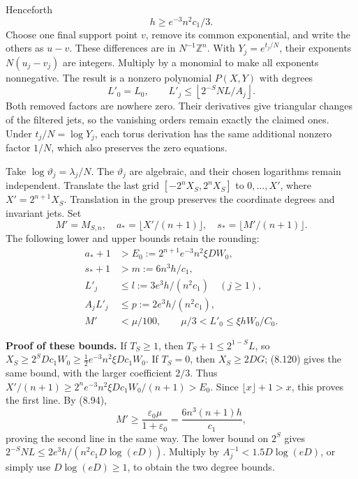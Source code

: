 \documentclass[
  11pt,
  a4paper,
]{article}
\begin{document}
Henceforth \[
h\ge e^{-3}n^2c_1/3.
\tag{8.120}
\] Choose one final support point \(v\), remove its common exponential,
and write the others as \(u-v\). These differences are in
\(N^{-1}\mathbb Z^n\). With \(Y_j=e^{t_j/N}\), their exponents
\(N(u_j-v_j)\) are integers. Multiply by a monomial to make all
exponents nonnegative. The result is a nonzero polynomial \(P(X,Y)\)
with degrees \[
L'_0=L_0,\qquad
L'_j\le\left\lfloor2^{-S}NL/A_j\right\rfloor.
\tag{8.121}
\] Both removed factors are nowhere zero. Their derivatives give
triangular changes of the filtered jets, so the vanishing orders remain
exactly the claimed ones. Under \(t_j/N=\log Y_j\), each torus
derivation has the same additional nonzero factor \(1/N\), which also
preserves the zero equations.

Take \(\log\vartheta_j=\lambda_j/N\). The \(\vartheta_j\) are algebraic,
and their chosen logarithms remain independent. Translate the last grid
\([-2^nX_S,2^nX_S]\) to \(0,\ldots,X'\), where \(X'=2^{n+1}X_S\).
Translation in the group preserves the coordinate degrees and invariant
jets. Set \[
M'=M_{S,n},\quad
a_*=\lfloor X'/(n+1)\rfloor,\quad
s_*=\lfloor M'/(n+1)\rfloor.
\] The following lower and upper bounds retain the rounding: \[
\begin{aligned}
a_*+1&>E_0:=2^{n+1}e^{-3}n^2\xi DW_0,\\
s_*+1&>m:=6n^3h/c_1,\\
L'_j&\le l:=3e^3h/(n^2c_1)\quad(j\ge1),\\
A_jL'_j&\le p:=2e^3h/(n^2c_1),\\
M'&<\mu/100,\qquad
\mu/3<L'_0\le\xi hW_0/C_0 .
\end{aligned}
\tag{8.122}
\]

\textbf{Proof of these bounds.} If \(T_S\ge1\), then
\(T_S+1\le2^{1-S}L\), so \(X_S\ge2^SDc_1W_0
\ge\tfrac12e^{-3}n^2\xi Dc_1W_0\). If \(T_S=0\), then \(X_S\ge2DG\);
(8.120) gives the same bound, with the larger coefficient \(2/3\). Thus
\(X'/(n+1)\ge
2^ne^{-3}n^2\xi Dc_1W_0/(n+1)>E_0\). Since \(\lfloor x\rfloor+1>x\),
this proves the first line. By (8.94), \[
M'\ge\frac{\varepsilon_0\mu}{1+\varepsilon_0}
=\frac{6n^3(n+1)h}{c_1},
\] proving the second line in the same way. The lower bound on \(2^S\)
gives \(2^{-S}NL\le2e^3h/(n^2c_1D\log(eD))\). Multiply by
\(A_j^{-1}<1.5D\log(eD)\), or simply use \(D\log(eD)\ge1\), to obtain
the two degree bounds.
\end{document}
